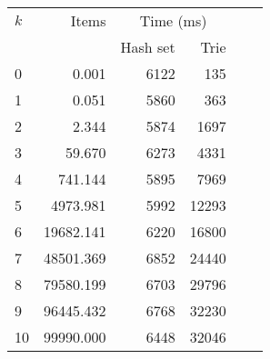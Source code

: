\begin{tabular}{lrrrrr}
\toprule
$k$ & Items & \multicolumn{2}{c}{Time (ms)} \\
\cmidrule(r){3-4}
 & & Hash set & Trie \\
\midrule
0 & 0.001 & 6122 & 135 \\
1 & 0.051 & 5860 & 363 \\
2 & 2.344 & 5874 & 1697 \\
3 & 59.670 & 6273 & 4331 \\
4 & 741.144 & 5895 & 7969 \\
5 & 4973.981 & 5992 & 12293 \\
6 & 19682.141 & 6220 & 16800 \\
7 & 48501.369 & 6852 & 24440 \\
8 & 79580.199 & 6703 & 29796 \\
9 & 96445.432 & 6768 & 32230 \\
10 & 99990.000 & 6448 & 32046 \\
\bottomrule
\end{tabular}
